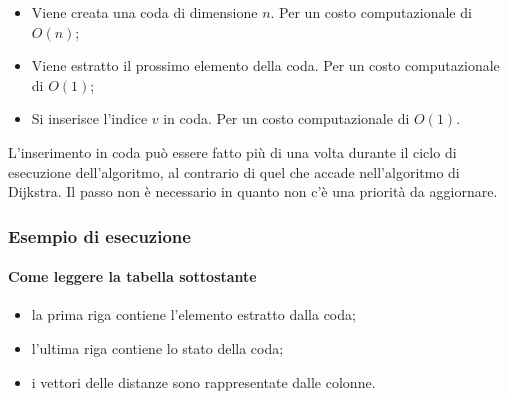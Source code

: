 \begin{itemize}
	\item [\circled{\ref{bellman:init}}]
	Viene creata una coda di dimensione \(n\).
	Per un costo computazionale di \(O(n)\);
	\item [\circled{\ref{bellman:remove}}]
	Viene estratto il prossimo elemento della coda.
	Per un costo computazionale di \(O(1)\);
	\item [\circled{\ref{bellman:add}}]
	Si inserisce l'indice \(v\) in coda.
	Per un costo computazionale di \(O(1)\).
\end{itemize}

L'inserimento in coda può essere fatto più di una volta durante il ciclo di esecuzione dell'algoritmo, al contrario di quel che accade nell'algoritmo di Dijkstra.
Il passo  non è necessario in quanto non c'è una priorità da aggiornare.

\subsubsection*{Esempio di esecuzione}

\begin{minipage}[c]{0.5\textwidth}\centering
\end{minipage}%
\begin{minipage}[c]{0.5\textwidth}
\paragraph{Come leggere la tabella sottostante}
\begin{itemize}[leftmargin=*]
	\item la prima riga contiene l'elemento estratto dalla coda;
	\item l'ultima riga contiene lo stato della coda;
	\item i vettori delle distanze sono rappresentate dalle colonne.
\end{itemize}
\end{minipage}

